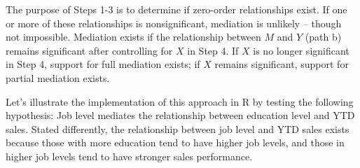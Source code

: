 \documentclass[
]{book}
\begin{document}
The purpose of Steps 1-3 is to determine if zero-order relationships exist. If one or more of these relationships is nonsignificant, mediation is unlikely -- though not impossible. Mediation exists if the relationship between \(M\) and \(Y\) (path b) remains significant after controlling for \(X\) in Step 4. If \(X\) is no longer significant in Step 4, support for full mediation exists; if \(X\) remains significant, support for partial mediation exists.

Let's illustrate the implementation of this approach in R by testing the following hypothesis: Job level mediates the relationship between education level and YTD sales. Stated differently, the relationship between job level and YTD sales exists because those with more education tend to have higher job levels, and those in higher job levels tend to have stronger sales performance.

\providecommand{\docline}[3]{\noalign{\global\setlength{\arrayrulewidth}{#1}}\arrayrulecolor[HTML]{#2}\cline{#3}}

\setlength{\tabcolsep}{2pt}

\renewcommand*{\arraystretch}{1.5}
\end{document}
